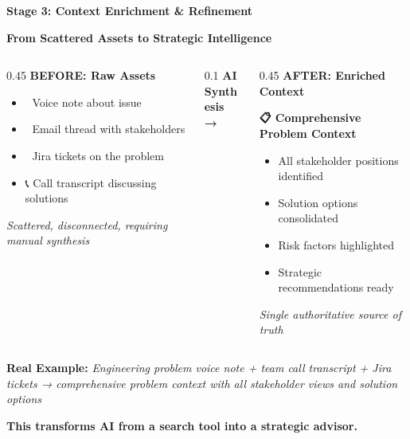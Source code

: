 \documentclass[
  ignorenonframetext,
  aspectratio=169,
]{beamer}
\providecommand{\tightlist}{%
  \setlength{\itemsep}{0pt}\setlength{\parskip}{0pt}}
\begin{document}
\begin{frame}{\textbf{Stage 3: Context Enrichment \& Refinement}}
\label{stage-3-context-enrichment-refinement}
\begin{block}{\textbf{From Scattered Assets to Strategic Intelligence}}
\label{from-scattered-assets-to-strategic-intelligence}
\begin{columns}[T]
\begin{column}{0.45\linewidth}
\textbf{BEFORE: Raw Assets}

\begin{itemize}
\tightlist
\item
  📝 Voice note about issue\\
\item
  📧 Email thread with stakeholders\\
\item
  🎫 Jira tickets on the problem\\
\item
  📞 Call transcript discussing solutions
\end{itemize}

\emph{Scattered, disconnected, requiring manual synthesis}
\end{column}

\begin{column}{0.1\linewidth}
\textbf{AI}\\
\textbf{Synthesis}\\
\textbf{→}
\end{column}

\begin{column}{0.45\linewidth}
\textbf{AFTER: Enriched Context}

\textbf{📋 Comprehensive Problem Context}

\begin{itemize}
\tightlist
\item
  All stakeholder positions identified
\item
  Solution options consolidated\\
\item
  Risk factors highlighted
\item
  Strategic recommendations ready
\end{itemize}

\emph{Single authoritative source of truth}
\end{column}
\end{columns}

\textbf{Real Example:} \emph{Engineering problem voice note + team call
transcript + Jira tickets → comprehensive problem context with all
stakeholder views and solution options}

\textbf{This transforms AI from a search tool into a strategic advisor.}
\end{block}
\end{frame}
\end{document}

